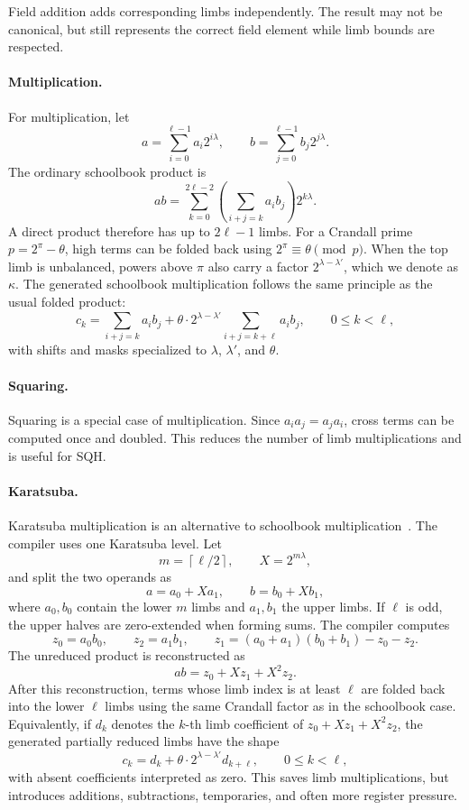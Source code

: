 Field addition adds corresponding limbs independently. The result may not be canonical, but still represents the correct field element while limb bounds are respected.

\paragraph{Multiplication.}
For multiplication, let
\[
    a=\sum_{i=0}^{\ell-1} a_i 2^{i\lambda},
    \qquad
    b=\sum_{j=0}^{\ell-1} b_j 2^{j\lambda}.
\]
The ordinary schoolbook product is
\[
    ab = \sum_{k=0}^{2\ell-2}
             \left(\sum_{i+j=k} a_i b_j\right)2^{k\lambda}.
\]
A direct product therefore has up to \(2\ell-1\) limbs. For a Crandall prime \(p=2^\pi-\theta\), high terms can be folded back using \(2^\pi \equiv \theta \pmod p\). When the top limb is unbalanced, powers above \(\pi\) also carry a factor \(2^{\lambda-\lambda'}\), which we denote as \(\kappa\). The generated schoolbook multiplication follows the same principle as the usual folded product:
\[
    c_k =
      \sum_{i+j=k} a_i b_j
      +
      \theta \cdot 2^{\lambda-\lambda'}
      \sum_{i+j=k+\ell} a_i b_j,
      \qquad 0 \leq k < \ell,
\]
with shifts and masks specialized to \(\lambda\), \(\lambda'\), and \(\theta\).

\paragraph{Squaring.}
Squaring is a special case of multiplication. Since \(a_i a_j=a_j a_i\), cross terms can be computed once and doubled. This reduces the number of limb multiplications and is useful for SQH.

\paragraph{Karatsuba.}
Karatsuba multiplication is an alternative to schoolbook multiplication~\cite{KarOfm62}. The compiler uses one Karatsuba level. Let
\[
    m=\left\lceil \ell/2 \right\rceil,\qquad X=2^{m\lambda},
\]
and split the two operands as
\[
    a=a_0+Xa_1,\qquad b=b_0+Xb_1,
\]
where \(a_0,b_0\) contain the lower \(m\) limbs and \(a_1,b_1\) the upper limbs. If \(\ell\) is odd, the upper halves are zero-extended when forming sums. The compiler computes
\[
    z_0=a_0b_0,\qquad
    z_2=a_1b_1,\qquad
    z_1=(a_0+a_1)(b_0+b_1)-z_0-z_2.
\]
The unreduced product is reconstructed as
\[
    ab = z_0 + Xz_1 + X^2z_2.
\]
After this reconstruction, terms whose limb index is at least \(\ell\) are folded back into the lower \(\ell\) limbs using the same Crandall factor as in the schoolbook case. Equivalently, if \(d_k\) denotes the \(k\)-th limb coefficient of \(z_0+Xz_1+X^2z_2\), the generated partially reduced limbs have the shape
\[
    c_k = d_k + \theta \cdot 2^{\lambda-\lambda'} d_{k+\ell},
    \qquad 0 \leq k < \ell,
\]
with absent coefficients interpreted as zero. This saves limb multiplications, but introduces additions, subtractions, temporaries, and often more register pressure.

